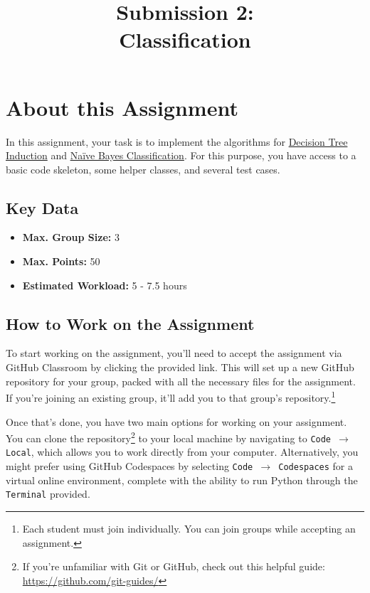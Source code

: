 \documentclass[
english,
smallborders
]{i6prcsht}
\begin{document}
\title{Submission 2: \\ Classification}
\maketitle
\vspace*{-2cm}

\section*{About this Assignment}

In this assignment, your task is to implement the algorithms for  \hyperref[sec:task-one]{Decision Tree Induction} and \hyperref[sec:task-two]{Naïve Bayes Classification}. For this purpose, you have access to a basic code skeleton, some helper classes, and several test cases.

\subsection*{Key Data}

\begin{itemize}
	\item \textbf{Max. Group Size:} 3
	\item \textbf{Max. Points:} 50
	\item \textbf{Estimated Workload:} 5 - 7.5 hours
\end{itemize}

\subsection*{How to Work on the Assignment}

To start working on the assignment, you'll need to accept the assignment via GitHub Classroom by clicking the provided link. This will set up a new GitHub repository for your group, packed with all the necessary files for the assignment. If you're joining an existing group, it'll add you to that group's repository.\footnote{Each student must join individually. You can join groups while accepting an assignment.}

Once that's done, you have two main options for working on your assignment. You can clone the repository\footnote{If you're unfamiliar with Git or GitHub, check out this helpful guide: \url{https://github.com/git-guides/}} to your local machine by navigating to \texttt{Code $\rightarrow$ Local}, which allows you to work directly from your computer. Alternatively, you might prefer using GitHub Codespaces by selecting \texttt{Code $\rightarrow$ Codespaces} for a virtual online environment, complete with the ability to run Python through the \texttt{Terminal} provided.
\end{document}
